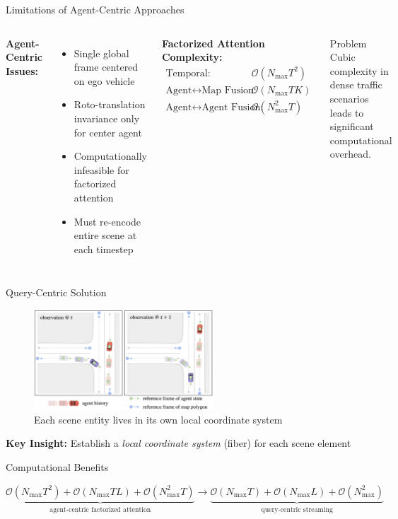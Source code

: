 \documentclass[10pt,aspectratio=169]{beamer}
\begin{document}
\begin{frame}{Limitations of Agent-Centric Approaches}
\begin{columns}[T]
\textbf{Agent-Centric Issues:}
\begin{itemize}
    \item Single global frame centered on ego vehicle
    \item Roto-translation invariance only for center agent
    \item Computationally infeasible for factorized attention
    \item Must re-encode entire scene at each timestep
\end{itemize}

\textbf{Factorized Attention Complexity:}
\begin{align}
\text{Temporal:} &\quad \mathcal{O}(N_{\max}T^{2}) \\
\text{Agent}\leftrightarrow\text{Map Fusion:} &\quad \mathcal{O}(N_{\max}T K) \\
\text{Agent}\leftrightarrow\text{Agent Fusion:} &\quad \mathcal{O}(N_{\max}^{2}T)
\end{align}

\begin{alertblock}{Problem}
Cubic complexity in dense traffic scenarios leads to significant computational overhead.
\end{alertblock}
\end{columns}
\end{frame}

\begin{frame}{Query-Centric Solution}
\begin{figure}[ht]
\centering
\includegraphics[width=0.6\textwidth]{docs/latex/figures/qc_reference_frame.png}
\caption{Each scene entity lives in its own local coordinate system}
\end{figure}

\textbf{Key Insight:} Establish a \emph{local coordinate system} (fiber) for each scene element

\begin{block}{Computational Benefits}
\begin{center}
\scriptsize
$\underbrace{\mathcal{O}(N_{\max}T^2)+\mathcal{O}(N_{\max}TL)+\mathcal{O}(N_{\max}^2T)}_{\text{agent-centric factorized attention}}
\longrightarrow
\underbrace{\mathcal{O}(N_{\max}T)+\mathcal{O}(N_{\max}L)+\mathcal{O}(N_{\max}^2)}_{\text{query-centric streaming}}$
\end{center}
\end{block}
\end{frame}
\end{document}
